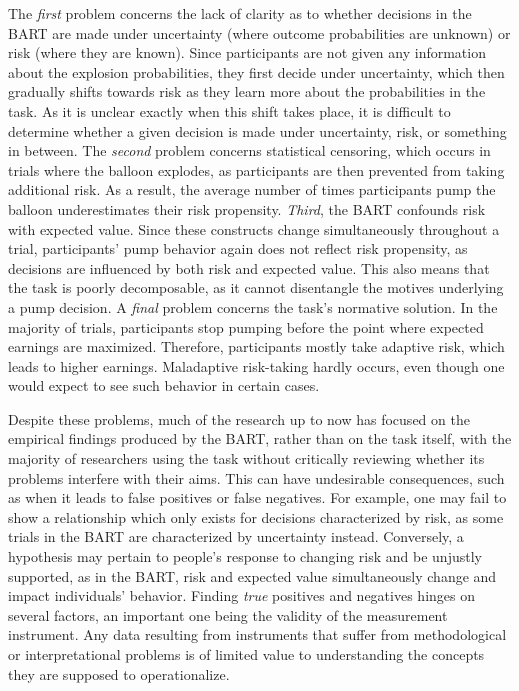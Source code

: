 \documentclass[serif, twocolumn, authordate, meta]{jote-article}
\begin{document}
The \emph{first} problem concerns the lack of clarity as to whether decisions in the BART are made under uncertainty (where outcome probabilities are unknown) or risk (where they are known). Since participants are not given any information about the explosion probabilities, they first decide under uncertainty, which then gradually shifts towards risk as they learn more about the probabilities in the task. As it is unclear exactly when this shift takes place, it is difficult to determine whether a given decision is made under uncertainty, risk, or something in between. The \emph{second} problem concerns statistical censoring, which occurs in trials where the balloon explodes, as participants are then prevented from taking additional risk. As a result, the average number of times participants pump the balloon underestimates their risk propensity. \emph{Third}, the BART confounds risk with expected value. Since these constructs change simultaneously throughout a trial, participants' pump behavior again does not reflect risk propensity, as decisions are influenced by both risk and expected value. This also means that the task is poorly decomposable, as it cannot disentangle the motives underlying a pump decision. A \emph{final} problem concerns the task's normative solution.
In the majority of trials, participants stop pumping before the point where expected earnings are maximized. Therefore, participants mostly take adaptive risk, which leads to higher earnings. Maladaptive risk-taking hardly occurs, even though one would expect to see such behavior in certain cases.

Despite these problems, much of the research up to now has focused on the empirical findings produced by the BART, rather than on the task itself, with the majority of researchers using the task without critically reviewing whether its problems interfere with their aims. This can have undesirable consequences, such as when it leads to false positives or false negatives. For example, one may fail to show a relationship which only exists for decisions characterized by risk, as some trials in the BART are characterized by uncertainty instead. Conversely, a hypothesis may pertain to people's response to changing risk and be unjustly supported, as in the BART, risk and expected value simultaneously change and impact individuals' behavior. Finding \emph{true} positives and negatives hinges on several factors, an important one being the validity of the measurement instrument. Any data resulting from instruments that suffer from methodological or interpretational problems is of limited value to understanding the concepts they are supposed to operationalize.
\end{document}
